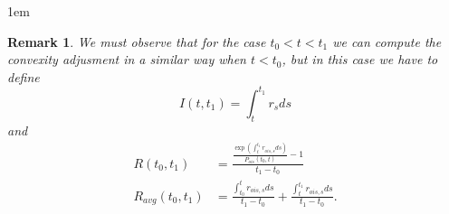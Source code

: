 \documentclass[a4paper,10pt]{article}
\newtheorem{remark}[theorem]{Remark}
\newcommand{\1}{\mathbf{1}}
\begin{document}
\fboxsep1em

\begin{remark}
We must observe that for the case $t_0 < t < t_1$ we can compute the convexity adjusment in a similar way when $t < t_0$, but in this case we have to define
\begin{equation*}
I(t,t_1)=\int_{t}^{t_1} r_s ds
\end{equation*}
and 
\begin{align*}
R(t_0,t_1) &= \frac{\frac{\exp(\int_{t}^{t_1} r_{ois,s} ds )}{P_{ois}(t_0,t)} - 1}{t_1 - t_0} \\
R_{avg}(t_0,t_1) &= \frac{\int_{t_0}^{t} r_{ois,s} ds}{t_1-t_0} +  \frac{\int_{t}^{t_1} r_{ois,s} ds}{t_1-t_0}.   
\end{align*}
\end{remark}
\end{document}

